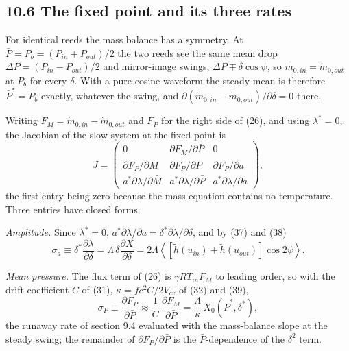 \subsection*{10.6 The fixed point and its three rates}

For identical reeds the mass balance has a symmetry. At $\bar P = P_b = (P_{in} + P_{out})/2$ the two reeds see the same mean drop $\Delta\bar P = (P_{in} - P_{out})/2$ and mirror-image swings, $\Delta\bar P \mp \delta\cos\psi$, so $\dot m_{0,in} = \dot m_{0,out}$ at $P_b$ for every $\delta$. With a pure-cosine waveform the steady mean is therefore $\bar P^* = P_b$ exactly, whatever the swing, and $\partial(\dot m_{0,in} - \dot m_{0,out})/\partial\delta = 0$ there.

Writing $F_M = \dot m_{0,in} - \dot m_{0,out}$ and $F_P$ for the right side of (26), and using $\lambda^* = 0$, the Jacobian of the slow system at the fixed point is
\begin{equation}
J = \begin{pmatrix} 0 & \partial F_M/\partial\bar P & 0 \\[2pt] \partial F_P/\partial\bar M & \partial F_P/\partial\bar P & \partial F_P/\partial a \\[2pt] a^*\partial\lambda/\partial\bar M & a^*\partial\lambda/\partial\bar P & a^*\partial\lambda/\partial a \end{pmatrix} , \tag{40}
\end{equation}
the first entry being zero because the mass equation contains no temperature. Three entries have closed forms.

\emph{Amplitude.} Since $\lambda^* = 0$, $a^*\partial\lambda/\partial a = \delta^*\partial\lambda/\partial\delta$, and by (37) and (38)
\begin{equation}
\sigma_a \equiv \delta^*\frac{\partial\lambda}{\partial\delta} = \Lambda\,\delta\frac{\partial X}{\partial\delta} = 2\Lambda\left\langle\left[\tilde h(u_{in}) + \tilde h(u_{out})\right]\cos 2\psi\right\rangle . \tag{41}
\end{equation}

\emph{Mean pressure.} The flux term of (26) is $\gamma RT_{in}F_M$ to leading order, so with the drift coefficient $C$ of (31), $\kappa = fc^2C/2\bar V_{cv}$ of (32) and (39),
\begin{equation}
\sigma_P \equiv \frac{\partial F_P}{\partial\bar P} \approx \frac{1}{C}\,\frac{\partial F_M}{\partial\bar P} = \frac{\Lambda}{\kappa}\,X_0(\bar P^*,\delta^*) , \tag{42}
\end{equation}
the runaway rate of section 9.4 evaluated with the mass-balance slope at the steady swing; the remainder of $\partial F_P/\partial\bar P$ is the $\bar P$-dependence of the $\delta^2$ term.

